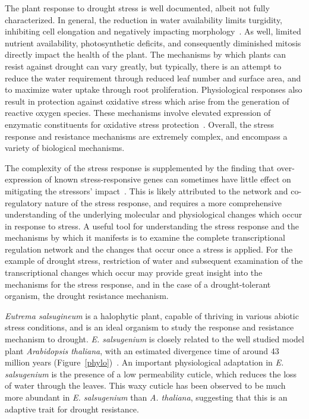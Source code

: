 \documentclass[12pt]{article}
\newcommand{\esal}{\textit{E. salsugenium}}
\begin{document}
	The plant response to drought stress is well documented, albeit not fully characterized. In general, the reduction in water availability limits turgidity, inhibiting cell elongation and negatively impacting morphology~\cite{farooq2009plant}. As well, limited nutrient availability, photosynthetic deficits, and consequently diminished mitosis directly impact the health of the plant. 
	The mechanisms by which plants can resist against drought can vary greatly, but typically, there is an attempt to reduce the water requirement through reduced leaf number and surface area, and to maximize water uptake through root proliferation. Physiological responses also result in protection against oxidative stress which arise from the generation of reactive oxygen species. These mechanisms involve elevated expression of enzymatic constituents for oxidative stress protection~\cite{farooq2009plant}. Overall, the stress response and resistance mechanisms are extremely complex, and encompass a variety of biological mechanisms. 
	
	The complexity of the stress response is supplemented by the finding that over-expression of known stress-responsive genes can sometimes have little effect on mitigating the stressors' impact~\cite{bartels2005}. This is likely attributed to the network and co-regulatory nature of the stress response, and requires a more comprehensive understanding of the underlying molecular and physiological changes which occur in response to stress. A useful tool for understanding the stress response and the mechanisms by which it manifests is to examine the complete transcriptional regulation network and the changes that occur once a stress is applied. For the example of drought stress, restriction of water and subsequent examination of the transcriptional changes which occur may provide great insight into the mechanisms for the stress response, and in the case of a drought-tolerant organism, the drought resistance mechanism. 
	
	\textit{Eutrema salsugineum} is a halophytic plant, capable of thriving in various abiotic stress conditions, and is an ideal organism to study the response and resistance mechanism to drought. \esal{} is closely related to the well studied model plant \textit{Arabidopsis thaliana}, with an estimated divergence time of around 43 million years (Figure~\ref{phylo})~\cite{yang2013reference}. An important physiological adaptation in \esal{} is the presence of a low permeability cuticle, which reduces the loss of water through the leaves. This waxy cuticle has been observed to be much more abundant in \esal{} than \textit{A. thaliana}, suggesting that this is an adaptive trait for drought resistance. 
	
\end{document}
